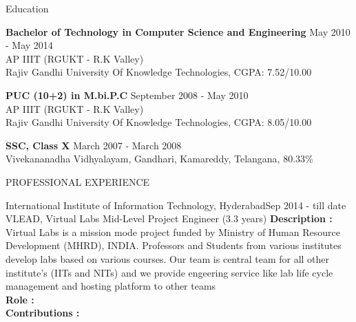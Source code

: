 \documentclass{resume} %
\begin{document}
\begin{rSection}{Education}

  {\bf Bachelor of Technology in Computer Science and Engineering} \hfill {May 2010 - May 2014}
  \\ 
  AP IIIT (RGUKT - R.K Valley)
  \\
  Rajiv Gandhi University Of Knowledge Technologies,  CGPA: 7.52/10.00  
  
  {\bf PUC (10+2) in M.bi.P.C} \hfill {September 2008 - May 2010}
  \\
  AP IIIT (RGUKT - R.K Valley)
  \\
  Rajiv Gandhi University Of Knowledge Technologies,  CGPA: 8.05/10.00  
  
  {\textbf{SSC, Class X}}  \hfill March 2007 - March  2008\\
  Vivekananadha Vidhyalayam, Gandhari, Kamareddy, Telangana, 80.33\% 

\end{rSection}




\begin{rSection}{PROFESSIONAL EXPERIENCE}

   \begin{rSubsection}
    {International Institute of Information Technology, Hyderabad}{Sep 2014 -
      till date} {VLEAD, Virtual Labs} {Mid-Level Project Engineer (3.3 years)}
    \textbf{Description :} Virtual Labs is a mission mode project funded by
    Ministry of Human Resource Development (MHRD), INDIA. Professors and
    Students from various institutes develop labs based on various courses. Our
    team is central team for all other institute's (IITs and NITs) and we
    provide engeering service like lab life cycle management and hosting
    platform to other teams \\
    \textbf{Role : }\\
    \textbf{Contributions : }
    
  \end{rSubsection}

\end{rSection}




\end{document}
